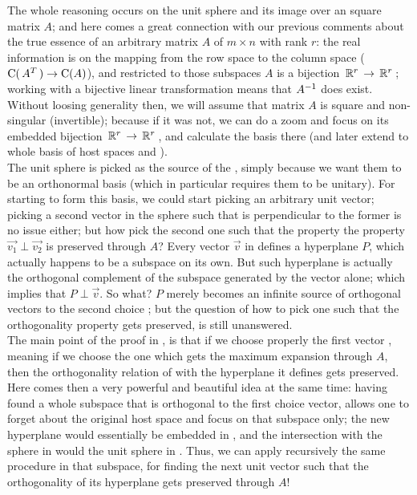 The whole reasoning occurs on the unit sphere and its image over an
square matrix $A$; and here comes a great connection with our previous
comments about the true essence of an arbitrary matrix $A$ of $m \times
n$ with rank $r$: the real information is on the mapping from the row
space to the column space ($\operatorname{C}(\,{A}^{T}\,) \rightarrow \operatorname{C}(A)$), and
restricted to those subspaces $A$ is a bijection $\,\mathbb{R}^{r}\, \rightarrow
\,\mathbb{R}^{r}\,$; working with a 
bijective linear transformation means that ${A}^{-1}$ does
exist. Without loosing generality then, we will assume that matrix $A$ is
square and non-singular (invertible); because if it was not, we can do
a zoom and focus on its embedded bijection $\,\mathbb{R}^{r}\, \rightarrow \,\mathbb{R}^{r}\,$, and
calculate the basis there (and later extend to whole basis of host
spaces  and ). \\

The unit sphere is picked as the source of the , simply
because we want them to be an orthonormal basis (which in particular
requires them to be unitary). For starting to form this basis, we
could start picking an arbitrary unit vector; picking a second vector
in the sphere such that is perpendicular to the former is no issue
either; but how pick the second one such that the property the
property $\vec{v_1} \perp \vec{v_2}$ is preserved through $A$? Every
vector $\vec{v}$ in  defines a hyperplane $P$, 
which actually happens to be a subspace on its own. But such hyperplane
is actually the orthogonal complement of the subspace generated by
the vector alone; which implies that $P \perp \vec{v}$. So what? $P$
merely becomes an infinite source of orthogonal vectors to the second
choice ; but the question of how to pick one such that the
orthogonality property gets preserved, is still unanswered. \\

The main point of the proof in \cite{blank89}, is that if we choose
properly the first vector , 
meaning if we choose the one which gets the maximum expansion through
$A$, then the orthogonality relation of  with the hyperplane it
defines gets preserved. Here comes then a very powerful and beautiful
idea at the same time: having found a whole subspace that is
orthogonal to the first choice vector, allows one to forget about the
original host space  and focus on that subspace only; the new
hyperplane would essentially be  embedded in , and the
intersection with the sphere in  would the unit sphere in
. Thus, we can apply recursively the same procedure in that
subspace, for finding the next unit vector such that the
orthogonality of its hyperplane gets preserved through $A$! \\ 


